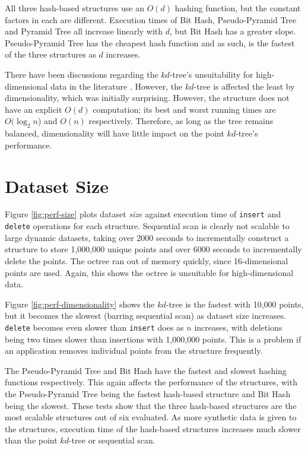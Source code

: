 All three hash-based structures use an $O(d)$ hashing function, but the constant factors in each are different. Execution times of Bit Hash, Pseudo-Pyramid Tree and Pyramid Tree all increase linearly with $d$, but Bit Hash has a greater slope. Pseudo-Pyramid Tree has the cheapest hash function and as such, is the fastest of the three structures as $d$ increases.

There have been discussions regarding the $kd$-tree's unsuitability for high-dimensional data in the literature \cite{highd-nn, search-highd-analysis}. However, the $kd$-tree is affected the least by dimensionality, which was initially surprising. However, the structure does not have an explicit $O(d)$ computation; its best and worst running times are $O(\log_2 n$) and $O(n)$ respectively. Therefore, as long as the tree remains balanced, dimensionality will have little impact on the point $kd$-tree's performance.

\section{Dataset Size}

Figure \ref{fig:perf-size} plots dataset \textit{size} against execution time of \texttt{insert} and \texttt{delete} operations for each structure. Sequential scan is clearly not scalable to large dynamic datasets, taking over 2000 seconds to incrementally construct a structure to store 1,000,000 unique points and over 6000 seconds to incrementally delete the points. The octree ran out of memory quickly, since 16-dimensional points are used. Again, this shows the octree is unsuitable for high-dimensional data.

Figure \ref{fig:perf-dimensionality} shows the $kd$-tree is the fastest with 10,000 points, but it becomes the slowest (barring sequential scan) as dataset size increases. \texttt{delete} becomes even slower than \texttt{insert} does as $n$ increases, with deletions being two times slower than insertions with 1,000,000 points. This is a problem if an application removes individual points from the structure frequently.

The Pseudo-Pyramid Tree and Bit Hash have the fastest and slowest hashing functions respectively. This again affects the performance of the structures, with the Pseudo-Pyramid Tree being the fastest hash-based structure and Bit Hash being the slowest. These tests show that the three hash-based structures are the most scalable structures out of six evaluated. As more synthetic data is given to the structures, execution time of the hash-based structures increases much slower than the point $kd$-tree or sequential scan.

